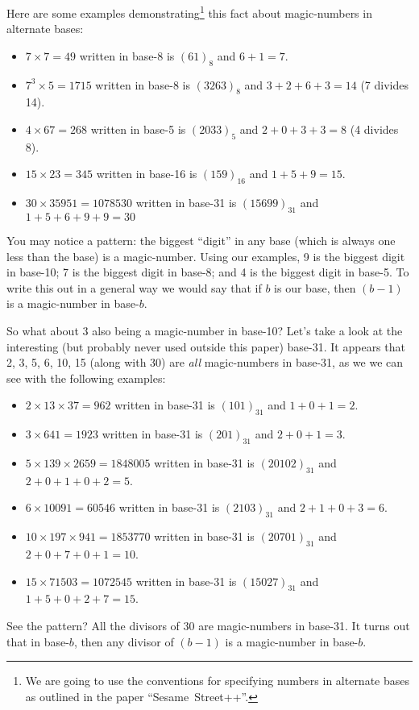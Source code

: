 \documentclass{article}
\begin{document}
Here are some examples demonstrating\footnote{We are going to use the conventions for specifying
numbers in alternate bases as outlined in the paper ``Sesame~Street++''.} this fact about magic-numbers
in alternate bases:
\begin{itemize}
\item $7\times{}7=49$ written in base-8 is $(61)_8$ and $6+1=7$.
\item $7^3\times{}5=1715$ written in base-8 is $(3263)_8$ and $3+2+6+3=14$ (7 divides 14).
\item $4\times{}67=268$ written in base-5 is $(2033)_5$ and $2+0+3+3=8$ (4 divides 8).
\item $15\times{}23=345$ written in base-16 is $(159)_{16}$ and $1+5+9=15$.
\item $30\times{}35951=1078530$ written in base-31 is $(15699)_{31}$ and $1+5+6+9+9=30$
\end{itemize}

You may notice a pattern: the biggest ``digit'' in any base (which is always one less than the base) is a magic-number.
Using our examples, 9 is the biggest
digit in base-10; 7 is the biggest digit in base-8; and 4 is the biggest digit in base-5.  To write this out in a general way
we would say that if $b$ is our base, then $(b-1)$ is a magic-number in base-$b$.

So what about 3 also being a magic-number in base-10?  Let's take a look at the interesting (but probably never used outside this paper) base-31.
It appears that 2, 3, 5, 6, 10, 15 (along with 30) are \emph{all} magic-numbers in base-31, as we we can see
with the following examples:
\begin{itemize}
\item $2\times{}13\times{}37=962$ written in base-31 is $(101)_{31}$ and $1+0+1=2$.
\item $3\times{}641=1923$ written in base-31 is $(201)_{31}$ and $2+0+1=3$.
\item $5\times{}139\times{}2659=1848005$ written in base-31 is $(20102)_{31}$ and $2+0+1+0+2=5$.
\item $6\times{}10091=60546$ written in base-31 is $(2103)_{31}$ and $2+1+0+3=6$.
\item $10\times{}197\times{}941=1853770$ written in base-31 is $(20701)_{31}$ and $2+0+7+0+1=10$.
\item $15\times{}71503=1072545$ written in base-31 is $(15027)_{31}$ and $1+5+0+2+7=15$.
\end{itemize}

See the pattern? All the divisors of 30 are magic-numbers in base-31.
It turns out that in base-$b$, then any divisor of $(b-1)$ is a magic-number in base-$b$.
\end{document}
